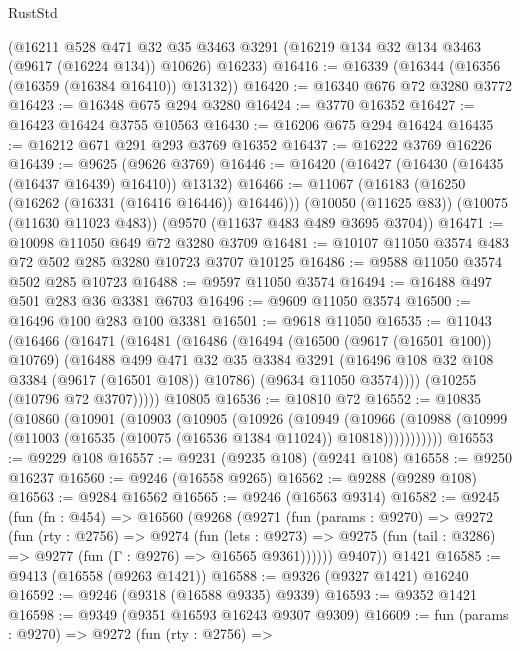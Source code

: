 \begin{lexlean}{RustStd}
\begin{coremodule}
{\begin{coremodule}
{{{{{{{{{{{{{{{{{{{{{{{{{{{{{{{{{    (@16211
      @528
      @471
      @32
      @35
      @3463
      @3291
      (@16219 @134 @32 @134 @3463 (@9617 (@16224 @134)) @10626)
      @16233)
@16416 := @16339 (@16344 (@16356 (@16359 (@16384 @16410)) @13132))
@16420 := @16340 @676 @72 @3280 @3772
@16423 := @16348 @675 @294 @3280
@16424 := @3770 @16352
@16427 := @16423 @16424 @3755 @10563
@16430 := @16206 @675 @294 @16424
@16435 := @16212 @671 @291 @293 @3769 @16352
@16437 := @16222 @3769 @16226
@16439 := @9625 (@9626 @3769)
@16446 := @16420 (@16427 (@16430 (@16435 (@16437 @16439) @16410)) @13132)
@16466 := @11067
    (@16183 (@16250 (@16262 (@16331 (@16416 @16446)) @16446)))
    (@10050 (@11625 @83))
    (@10075 (@11630 @11023 @483))
    (@9570 (@11637 @483 @489 @3695 @3704))
@16471 := @10098 @11050 @649 @72 @3280 @3709
@16481 := @10107 @11050 @3574 @483 @72 @502 @285 @3280 @10723 @3707 @10125
@16486 := @9588 @11050 @3574 @502 @285 @10723
@16488 := @9597 @11050 @3574
@16494 := @16488 @497 @501 @283 @36 @3381 @6703
@16496 := @9609 @11050 @3574
@16500 := @16496 @100 @283 @100 @3381
@16501 := @9618 @11050
@16535 := @11043
    (@16466
      (@16471
        (@16481
          (@16486
            (@16494
              (@16500 (@9617 (@16501 @100)) @10769)
              (@16488
                @499
                @471
                @32
                @35
                @3384
                @3291
                (@16496 @108 @32 @108 @3384 (@9617 (@16501 @108)) @10786)
                (@9634 @11050 @3574))))
          (@10255 (@10796 @72 @3707)))))
    @10805
@16536 := @10810 @72
@16552 := @10835
    (@10860
      (@10901
        (@10903
          (@10905
            (@10926
              (@10949
                (@10966
                  (@10988 (@10999 (@11003 (@16535 (@10075 (@16536 @1384 @11024)) @10818)))))))))))
@16553 := @9229 @108
@16557 := @9231 (@9235 @108) (@9241 @108)
@16558 := @9250 @16237
@16560 := @9246 (@16558 @9265)
@16562 := @9288 (@9289 @108)
@16563 := @9284 @16562
@16565 := @9246 (@16563 @9314)
@16582 := @9245
    (fun (fn : @454) =>
    @16560
      (@9268
        (@9271
          (fun (params : @9270) =>
          @9272
            (fun (rty : @2756) =>
            @9274
              (fun (lets : @9273) =>
              @9275 (fun (tail : @3286) => @9277 (fun (Γ : @9276) => @16565 @9361))))))
        @9407))
    @1421
@16585 := @9413 (@16558 (@9263 @1421))
@16588 := @9326 (@9327 @1421) @16240
@16592 := @9246 (@9318 (@16588 @9335) @9339)
@16593 := @9352 @1421
@16598 := @9349 (@9351 @16593 @16243 @9307 @9309)
@16609 := fun (params : @9270) =>
  @9272
    (fun (rty : @2756) =>
}}}}}}}}}}}}}}}}}}}}}}}}}}}}}}}}}
\end{coremodule}}
\end{coremodule}
\end{lexlean}
